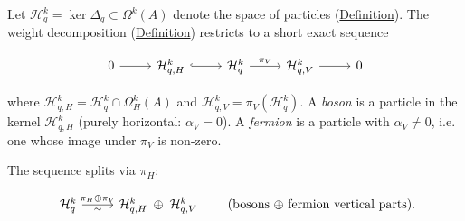 \begin{definition}
  \label{def:fermion-boson-decomposition}
Let $\mathcal{H}_q^k = \ker\Delta_q \subset \Omega^k(A)$ denote the
space of particles (\hyperref[def:q-harmonic-form]{Definition}).  The weight
decomposition (\hyperref[def:weight-decomposition]{Definition}) restricts to
a short exact sequence

\begin{equation}\label{eq:fermion-boson-ses}
\begin{tikzcd}[column sep=2.5em]
  0 \ar[r]
  & \mathcal{H}_{q,H}^k \ar[r, hook]
  & \mathcal{H}_q^k \ar[r, "\pi_V"]
  & \mathcal{H}_{q,V}^k \ar[r]
  & 0
\end{tikzcd}
\end{equation}

where $\mathcal{H}_{q,H}^k = \mathcal{H}_q^k \cap \Omega^k_H(A)$
and $\mathcal{H}_{q,V}^k = \pi_V(\mathcal{H}_q^k)$.  A \emph{boson}
is a particle in the kernel $\mathcal{H}_{q,H}^k$ (purely horizontal:
$\alpha_V = 0$).  A \emph{fermion} is a particle with
$\alpha_V \neq 0$, i.e. one whose image under $\pi_V$ is non-zero.

The sequence splits via $\pi_H$:

\begin{equation}\label{eq:fermion-boson-split}
\begin{tikzcd}[column sep=2.5em]
  \mathcal{H}_q^k
    \ar[r, "\pi_H \oplus \pi_V", "\sim"']
  & \mathcal{H}_{q,H}^k \;\oplus\; \mathcal{H}_{q,V}^k
\end{tikzcd}
\qquad
\text{(bosons $\oplus$ fermion vertical parts).}
\end{equation}
\end{definition}

